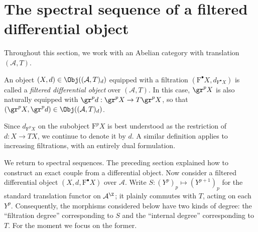 
\section{The spectral sequence of a filtered differential object}
\label{sec:filtered-diff-ss}
\hypertarget{o014.aljabr2.chapter5.filtered-differential-spectral-sequence}{ }

Throughout this section, we work with an Abelian category with translation
$(\mathcal{A},T)$.

\begin{definition}\label{def:filtered-diffop}
	An object $(X,d)\in\Obj((\mathcal{A},T)_d)$ equipped with a filtration
	$\left(\mathrm{F}^\bullet X,d_{\mathrm{F}^\bullet X}\right)$ is called a
	\emph{filtered differential object} over $(\mathcal{A},T)$. In this case,
	$\gr^pX$ is also naturally equipped with
	$\gr^pd:\gr^pX\to T\gr^pX$, so that
	$(\gr^pX,\gr^pd)\in\Obj((\mathcal{A},T)_d)$.
\end{definition}

Since $d_{\mathrm{F}^pX}$ on the subobject $\mathrm{F}^pX$ is best
understood as the restriction of $d:X\to TX$, we continue to denote it by
$d$. A similar definition applies to increasing filtrations, with an entirely
dual formulation.

We return to spectral sequences. The preceding section explained how to
construct an exact couple from a differential object. Now consider a filtered
differential object $(X,d,\mathrm{F}^\bullet X)$ over $\mathcal{A}$. Write
$S:(Y^p)_p\mapsto(Y^{p+1})_p$ for the standard translation functor on
$\mathcal{A}^{\Z}$; it plainly commutes with $T$, acting on each $Y^p$.
Consequently, the morphisms considered below have two kinds of degree: the
``filtration degree'' corresponding to $S$ and the ``internal degree''
corresponding to $T$. For the moment we focus on the former.


